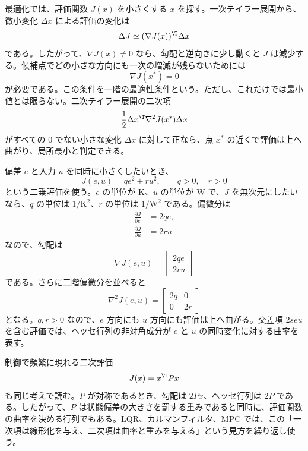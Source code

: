 最適化では、評価関数 $J(x)$ を小さくする $x$ を探す。一次テイラー展開から、微小変化 $\Delta x$ による評価の変化は
\begin{equation}
  \Delta J
  \simeq
  (\nabla J(x))^\T \Delta x
\end{equation}
である。したがって、$\nabla J(x)\ne0$ なら、勾配と逆向きに少し動くと $J$ は減少する。候補点でどの小さな方向にも一次の増減が残らないためには
\begin{equation}
  \nabla J(x^\ast)=0
\end{equation}
が必要である。この条件を一階の最適性条件という。ただし、これだけでは最小値とは限らない。二次テイラー展開の二次項
\begin{equation}
  \frac{1}{2}\Delta x^\T \nabla^2 J(x^\ast)\Delta x
\end{equation}
がすべての $0$ でない小さな変化 $\Delta x$ に対して正なら、点 $x^\ast$ の近くで評価は上へ曲がり、局所最小と判定できる。

\begin{example}[二乗評価の曲率]
偏差 $e$ と入力 $u$ を同時に小さくしたいとき、
\begin{equation}
  J(e,u)=q e^2+r u^2,\qquad q>0,\quad r>0
\end{equation}
という二乗評価を使う。$e$ の単位が K、$u$ の単位が W で、$J$ を無次元にしたいなら、$q$ の単位は $1/\mathrm{K^2}$、$r$ の単位は $1/\mathrm{W^2}$ である。偏微分は
\begin{align}
  \frac{\partial J}{\partial e}&=2qe,\\
  \frac{\partial J}{\partial u}&=2ru
\end{align}
なので、勾配は
\begin{equation}
  \nabla J(e,u)
  =
  \begin{bmatrix}
    2qe\\
    2ru
  \end{bmatrix}
\end{equation}
である。さらに二階偏微分を並べると
\begin{equation}
  \nabla^2 J(e,u)
  =
  \begin{bmatrix}
    2q&0\\
    0&2r
  \end{bmatrix}
\end{equation}
となる。$q,r>0$ なので、$e$ 方向にも $u$ 方向にも評価は上へ曲がる。交差項 $2s e u$ を含む評価では、ヘッセ行列の非対角成分が $e$ と $u$ の同時変化に対する曲率を表す。
\end{example}

制御で頻繁に現れる二次評価
\begin{equation}
  J(x)=x^\T P x
\end{equation}
も同じ考えで読む。$P$ が対称であるとき、勾配は $2Px$、ヘッセ行列は $2P$ である。したがって、$P$ は状態偏差の大きさを罰する重みであると同時に、評価関数の曲率を決める行列でもある。LQR、カルマンフィルタ、MPC では、この「一次項は線形化を与え、二次項は曲率と重みを与える」という見方を繰り返し使う。
